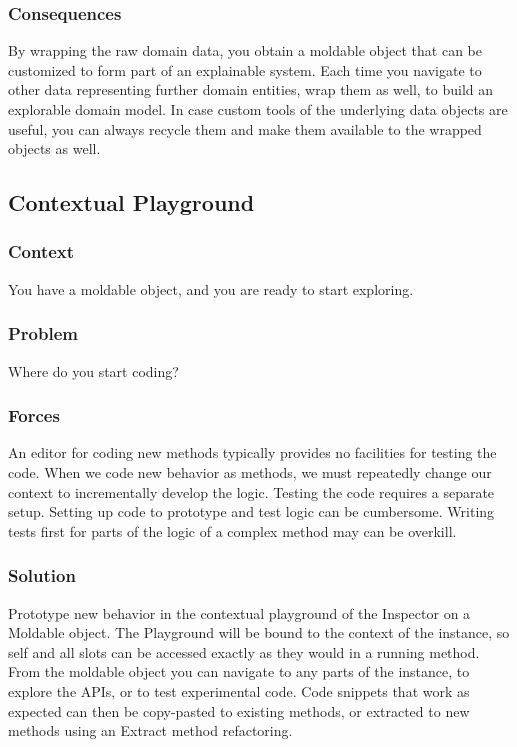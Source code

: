 \documentclass[sigconf]{acmart}
\begin{document}
\subsubsection*{Consequences}

By wrapping the raw domain data, you obtain a moldable object that can be customized to form part of an explainable system.
Each time you navigate to other data representing further domain entities, wrap them as well, to build an explorable domain model.
In case custom tools of the underlying data objects are useful, you can always recycle them and make them available to the wrapped objects as well.

\subsection*{Contextual Playground}\label{pat:contextualPlayground}
\subsubsection*{Context}
You have a moldable object, and you are ready to start exploring.

\subsubsection*{Problem}
Where do you start coding?

\subsubsection*{Forces}
An editor for coding new methods typically provides no facilities for testing the code.
When we code new behavior as methods, we must repeatedly change our context to incrementally develop the logic.
Testing the code requires a separate setup.
Setting up code to prototype and test logic can be cumbersome.
Writing tests first for parts of the logic of a complex method may can be overkill.

\subsubsection*{Solution}
Prototype new behavior in the contextual playground of the Inspector on a Moldable object.
The Playground will be bound to the context of the instance, so self and all slots can be accessed exactly as they would in a running method.
From the moldable object you can navigate to any parts of the instance, to explore the APIs, or to test experimental code.
Code snippets that work as expected can then be copy-pasted to existing methods, or extracted to new methods using an Extract method refactoring.
\end{document}
